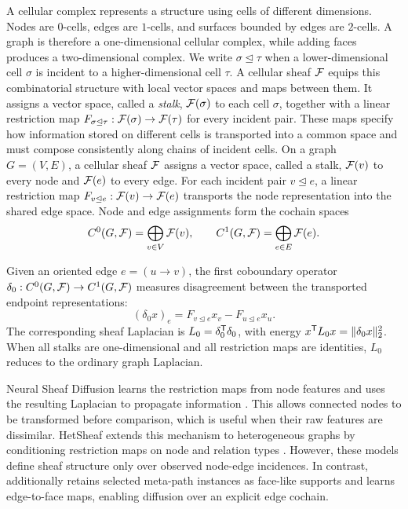 A cellular complex represents a structure using cells of different dimensions. Nodes are
$0$-cells, edges are $1$-cells, and surfaces bounded by edges are $2$-cells. A graph is therefore
a one-dimensional cellular complex, while adding faces produces a two-dimensional complex. We
write $\sigma\unlhd\tau$ when a lower-dimensional cell $\sigma$ is incident to a
higher-dimensional cell $\tau$.
A cellular sheaf $\mathcal{F}$ equips this combinatorial structure with local vector spaces and maps
between them. It assigns a vector space, called a \emph{stalk}, $\mathcal{F}(\sigma)$ to each cell
$\sigma$, together with a linear restriction map
$F_{\sigma\unlhd\tau}:\mathcal{F}(\sigma)\rightarrow\mathcal{F}(\tau)$ for every incident pair. These maps specify
how information stored on different cells is transported into a common space and must compose
consistently along chains of incident cells.
On a graph $G=(V,E)$, a cellular sheaf $\mathcal{F}$
assigns a vector space, called a stalk, $\mathcal{F}(v)$ to every node and $\mathcal{F}(e)$ to every edge. For
each incident pair $v\unlhd e$, a linear restriction map
$F_{v\unlhd e}:\mathcal{F}(v)\rightarrow\mathcal{F}(e)$ transports the node representation into the shared edge
space. Node and edge assignments form the cochain spaces
\begin{equation}
  C^0(G,\mathcal{F})=\bigoplus_{v\in V}\mathcal{F}(v),
  \qquad
  C^1(G,\mathcal{F})=\bigoplus_{e\in E}\mathcal{F}(e).
\end{equation}

Given an oriented edge $e=(u\rightarrow v)$, the first coboundary operator
$\delta_0:C^0(G,\mathcal{F})\rightarrow C^1(G,\mathcal{F})$ measures disagreement between the transported endpoint
representations:
\begin{equation}
  (\delta_0x)_e
  =
  F_{v\unlhd e}x_v-F_{u\unlhd e}x_u.
  \label{eq:background-delta0}
\end{equation}
The corresponding sheaf Laplacian is
$L_0=\delta_0^{\mathsf{T}}\delta_0$, with energy
$x^{\mathsf{T}}L_0x=\lVert\delta_0x\rVert_2^2$. When all stalks are one-dimensional and all
restriction maps are identities, $L_0$ reduces to the ordinary graph Laplacian.

Neural Sheaf Diffusion learns the restriction maps from node features and uses the resulting
Laplacian to propagate information \cite{bodnar2022neural}. This allows connected nodes to be
transformed before comparison, which is useful when their raw features are dissimilar.
HetSheaf extends this mechanism to heterogeneous graphs by conditioning restriction maps on node
and relation types \cite{braithwaite2024heterogeneous}. However, these models define sheaf
structure only over observed node-edge incidences. In contrast, \method{} additionally retains
selected meta-path instances as face-like supports and learns edge-to-face maps, enabling
diffusion over an explicit edge cochain.


